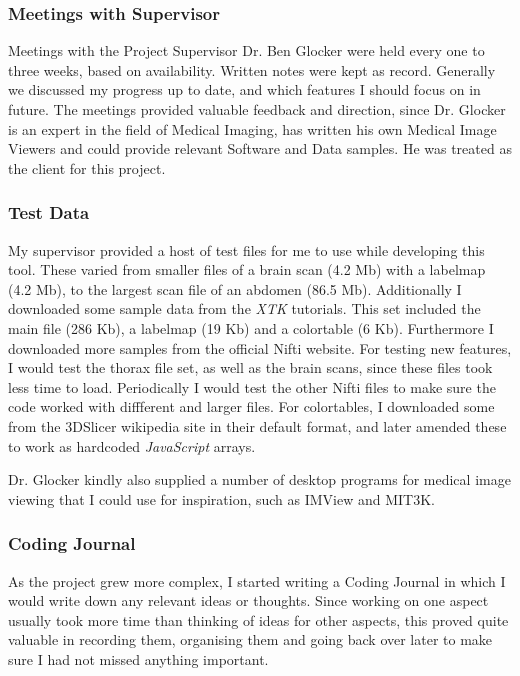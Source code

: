 \documentclass[a4paper,11pt,twoside]{article}
\begin{document}
\subsubsection{Meetings with Supervisor}

Meetings with the Project Supervisor Dr. Ben Glocker were held every one to three weeks, based on availability. Written notes were kept as record. Generally we discussed my progress up to date, and which features I should focus on in future. The meetings provided valuable feedback and direction, since Dr. Glocker is an expert in the field of Medical Imaging, has written his own Medical Image Viewers and could provide relevant Software and Data samples. He was treated as the client for this project.


\subsubsection{Test Data}

My supervisor provided a host of test files for me to use while developing this tool. These varied from smaller files of a brain scan (4.2 Mb) with a labelmap (4.2 Mb), to the largest scan file of an abdomen (86.5 Mb). Additionally I downloaded some sample data from the \textit{XTK} tutorials. This set included the main file (286 Kb), a labelmap (19 Kb) and a colortable (6 Kb). Furthermore I downloaded more samples from the official Nifti website. For testing new features, I would test the thorax file set, as well as the brain scans, since these files took less time to load. Periodically I would test the other Nifti files to make sure the code worked with diffferent and larger files.
For colortables, I downloaded some from the 3DSlicer wikipedia site in their default format, and later amended these to work as hardcoded \textit{JavaScript} arrays.

Dr. Glocker kindly also supplied a number of desktop programs for medical image viewing that I could use for inspiration, such as IMView and MIT3K.

\subsubsection{Coding Journal}

As the project grew more complex, I started writing a Coding Journal in which I would write down any relevant ideas or thoughts. Since working on one aspect usually took more time than thinking of ideas for other aspects, this proved quite valuable in recording them, organising them and going back over later to make sure I had not missed anything important.
\end{document}
